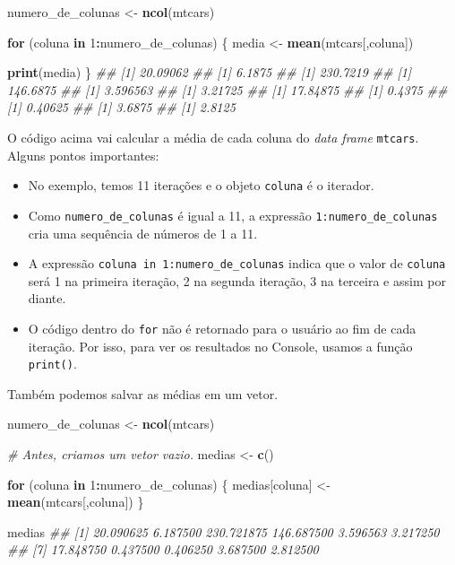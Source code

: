 \documentclass[]{book}
\newenvironment{Shaded}{\begin{snugshade}}{\end{snugshade}}
\newcommand{\CommentTok}[1]{\textcolor[rgb]{0.56,0.35,0.01}{\textit{#1}}}
\newcommand{\ControlFlowTok}[1]{\textcolor[rgb]{0.13,0.29,0.53}{\textbf{#1}}}
\newcommand{\DecValTok}[1]{\textcolor[rgb]{0.00,0.00,0.81}{#1}}
\newcommand{\KeywordTok}[1]{\textcolor[rgb]{0.13,0.29,0.53}{\textbf{#1}}}
\newcommand{\NormalTok}[1]{#1}
\newcommand{\OperatorTok}[1]{\textcolor[rgb]{0.81,0.36,0.00}{\textbf{#1}}}
\newcommand{\StringTok}[1]{\textcolor[rgb]{0.31,0.60,0.02}{#1}}
\begin{document}
\begin{Shaded}
\begin{Highlighting}[]
\NormalTok{numero_de_colunas <-}\StringTok{ }\KeywordTok{ncol}\NormalTok{(mtcars)}

\ControlFlowTok{for}\NormalTok{ (coluna }\ControlFlowTok{in} \DecValTok{1}\OperatorTok{:}\NormalTok{numero_de_colunas) \{}
\NormalTok{  media <-}\StringTok{ }\KeywordTok{mean}\NormalTok{(mtcars[,coluna])}
  
  \KeywordTok{print}\NormalTok{(media)}
\NormalTok{\}}
\CommentTok{## [1] 20.09062}
\CommentTok{## [1] 6.1875}
\CommentTok{## [1] 230.7219}
\CommentTok{## [1] 146.6875}
\CommentTok{## [1] 3.596563}
\CommentTok{## [1] 3.21725}
\CommentTok{## [1] 17.84875}
\CommentTok{## [1] 0.4375}
\CommentTok{## [1] 0.40625}
\CommentTok{## [1] 3.6875}
\CommentTok{## [1] 2.8125}
\end{Highlighting}
\end{Shaded}

O código acima vai calcular a média de cada coluna do \emph{data frame} \texttt{mtcars}. Alguns pontos importantes:

\begin{itemize}
\item
  No exemplo, temos 11 iterações e o objeto \texttt{coluna} é o iterador.
\item
  Como \texttt{numero\_de\_colunas} é igual a 11, a expressão \texttt{1:numero\_de\_colunas} cria uma sequência de números de 1 a 11.
\item
  A expressão \texttt{coluna\ in\ 1:numero\_de\_colunas} indica que o valor de \texttt{coluna} será 1 na primeira iteração, 2 na segunda iteração, 3 na terceira e assim por diante.
\item
  O código dentro do \texttt{for} não é retornado para o usuário ao fim de cada iteração. Por isso, para ver os resultados no Console, usamos a função \texttt{print()}.
\end{itemize}

Também podemos salvar as médias em um vetor.

\begin{Shaded}
\begin{Highlighting}[]
\NormalTok{numero_de_colunas <-}\StringTok{ }\KeywordTok{ncol}\NormalTok{(mtcars)}

\CommentTok{# Antes, criamos um vetor vazio.}
\NormalTok{medias <-}\StringTok{ }\KeywordTok{c}\NormalTok{()}

\ControlFlowTok{for}\NormalTok{ (coluna }\ControlFlowTok{in} \DecValTok{1}\OperatorTok{:}\NormalTok{numero_de_colunas) \{}
\NormalTok{  medias[coluna] <-}\StringTok{ }\KeywordTok{mean}\NormalTok{(mtcars[,coluna])}
\NormalTok{\}}

\NormalTok{medias}
\CommentTok{##  [1]  20.090625   6.187500 230.721875 146.687500   3.596563   3.217250}
\CommentTok{##  [7]  17.848750   0.437500   0.406250   3.687500   2.812500}
\end{Highlighting}
\end{Shaded}
\end{document}
